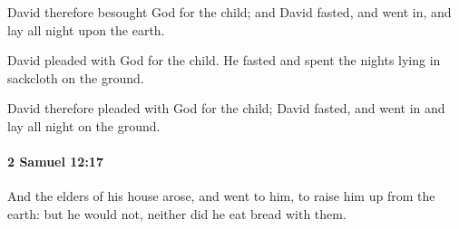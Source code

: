 			\begin{versebox}
					\item[BHS] 
					\item[ASV] David therefore besought God for the child; and David fasted, and went in, and lay all night upon the earth.
					\item[NIV] David pleaded with God for the child. He fasted and spent the nights lying in sackcloth on the ground.
					\item[NRSV] David therefore pleaded with God for the child; David fasted, and went in and lay all night on the ground.
			\end{versebox}

		\paragraph{2 Samuel 12:17} %
			\label{2SAMUEL-12-17}

			And the elders of his house arose, and went to him, to raise him up from the earth: but he would not, neither did he eat bread with them.


